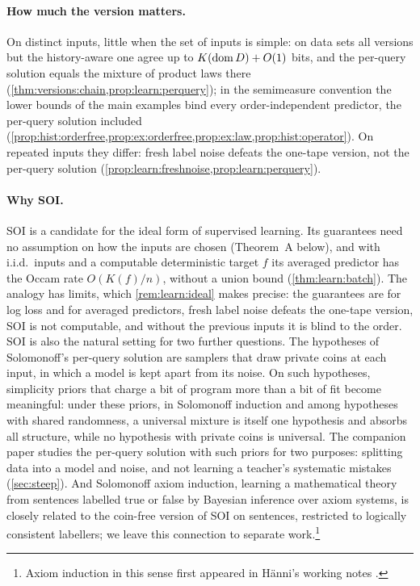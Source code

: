 \paragraph{How much the version matters.} On distinct inputs, little when the set of inputs is simple: on data sets all versions but the history-aware one agree up to $K(\operatorname{dom} D)+O(1)$ bits, and the per-query solution equals the mixture of product laws there (\cref{thm:versions:chain,prop:learn:perquery}); in the semimeasure convention the lower bounds of the main examples bind every order-independent predictor, the per-query solution included (\cref{prop:hist:orderfree,prop:ex:orderfree,prop:ex:law,prop:hist:operator}). On repeated inputs they differ: fresh label noise defeats the one-tape version, not the per-query solution (\cref{prop:learn:freshnoise,prop:learn:perquery}).

\paragraph{Why SOI.} SOI is a candidate for the ideal form of supervised learning. Its guarantees need no assumption on how the inputs are chosen (Theorem~A below), and with i.i.d.\ inputs and a computable deterministic target $f$ its averaged predictor has the Occam rate $O(K(f)/n)$, without a union bound (\cref{thm:learn:batch}). The analogy has limits, which \cref{rem:learn:ideal} makes precise: the guarantees are for log loss and for averaged predictors, fresh label noise defeats the one-tape version, SOI is not computable, and without the previous inputs it is blind to the order. SOI is also the natural setting for two further questions. The hypotheses of Solomonoff's per-query solution are samplers that draw private coins at each input, in which a model is kept apart from its noise. On such hypotheses, simplicity priors that charge a bit of program more than a bit of fit become meaningful: under these priors, in Solomonoff induction and among hypotheses with shared randomness, a universal mixture is itself one hypothesis and absorbs all structure, while no hypothesis with private coins is universal. The companion paper studies the per-query solution with such priors for two purposes: splitting data into a model and noise, and not learning a teacher's systematic mistakes (\cref{sec:steep}). And Solomonoff axiom induction, learning a mathematical theory from sentences labelled true or false by Bayesian inference over axiom systems, is closely related to the coin-free version of SOI on sentences, restricted to logically consistent labellers; we leave this connection to separate work.\footnote{Axiom induction in this sense first appeared in H\"anni's working notes \citep{hanni2026notes}.}

